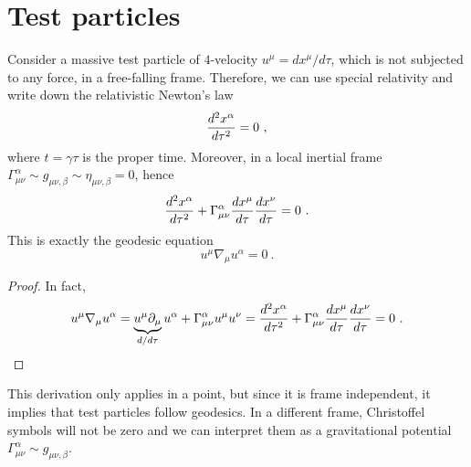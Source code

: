 \section{Test particles}

    Consider a massive test particle of $4$-velocity $u^\mu = dx^\mu / d\tau$, which is not subjected to any force, in a free-falling frame. Therefore, we can use special relativity and write down the relativistic Newton's law
    \begin{equation*}
        \frac{d^2x^\alpha}{d\tau^2} = 0 ~,
    \end{equation*}
    where $t = \gamma \tau$ is the proper time. Moreover, in a local inertial frame $\Gamma^\alpha_{\mu\nu} \sim g_{\mu\nu,\beta} \sim \eta_{\mu\nu,\beta} = 0$, hence
    \begin{equation*}
        \frac{d^2x^\alpha}{d\tau^2} + \Gamma^\alpha_{\mu\nu} \frac{dx^\mu}{d\tau} \frac{dx^\nu}{d\tau} = 0 ~.
    \end{equation*}
    This is exactly the geodesic equation 
    \begin{equation*}
        u^\mu \nabla_\mu u^\alpha = 0 ~.
    \end{equation*}
    \begin{proof}
        In fact, 
        \begin{equation*}
            u^\mu \nabla_\mu u^\alpha = \underbrace{u^\mu \partial_\mu}_{d/d\tau} u^\alpha + \Gamma^\alpha_{\mu\nu} u^\mu u^\nu = \frac{d^2x^\alpha}{d\tau^2} + \Gamma^\alpha_{\mu\nu} \frac{dx^\mu}{d\tau} \frac{dx^\nu}{d\tau} = 0 ~.
        \end{equation*}
    \end{proof}
    
    \noindent This derivation only applies in a point, but since it is frame independent, it implies that test particles follow geodesics. In a different frame, Christoffel symbols will not be zero and we can interpret them as a gravitational potential $\Gamma^\alpha_{\mu\nu} \sim g_{\mu\nu,\beta}$.

